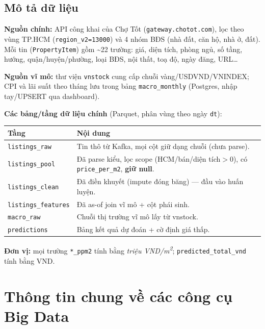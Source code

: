 \documentclass[12pt,a4paper]{article}
\begin{document}
\subsection{Mô tả dữ liệu}
\textbf{Nguồn chính:} API công khai của Chợ Tốt (\texttt{gateway.chotot.com}), lọc theo vùng TP.HCM (\texttt{region\_v2=13000}) và 4 nhóm BĐS (nhà đất, căn hộ, nhà ở, đất). Mỗi tin (\texttt{PropertyItem}) gồm \textasciitilde22 trường: giá, diện tích, phòng ngủ, số tầng, hướng, quận/huyện/phường, loại BĐS, nội thất, toạ độ, ngày đăng, URL\ldots

\textbf{Nguồn vĩ mô:} thư viện \texttt{vnstock} cung cấp chuỗi vàng/USDVND/VNINDEX; CPI và lãi suất theo tháng lưu trong bảng \texttt{macro\_monthly} (Postgres, nhập tay/UPSERT qua dashboard).

\textbf{Các bảng/tầng dữ liệu chính} (Parquet, phân vùng theo ngày \texttt{dt}):

\begin{center}
\begin{tabularx}{\textwidth}{@{}l X@{}}
\toprule
\textbf{Tầng} & \textbf{Nội dung} \\
\midrule
\texttt{listings\_raw}      & Tin thô từ Kafka, mọi cột giữ dạng chuỗi (chưa parse). \\
\texttt{listings\_pool}     & Đã parse kiểu, lọc scope (HCM/bán/diện tích$>$0), có \texttt{price\_per\_m2}, \textbf{giữ null}. \\
\texttt{listings\_clean}    & Đã điền khuyết (impute đóng băng) — đầu vào huấn luyện. \\
\texttt{listings\_features} & Đã as-of join vĩ mô + cột phái sinh. \\
\texttt{macro\_raw}         & Chuỗi thị trường vĩ mô lấy từ vnstock. \\
\texttt{predictions}        & Bảng kết quả dự đoán + cờ định giá thấp. \\
\bottomrule
\end{tabularx}
\end{center}

\noindent\textbf{Đơn vị:} mọi trường \texttt{*\_ppm2} tính bằng \textit{triệu VND/m\textsuperscript{2}}; \texttt{predicted\_total\_vnd} tính bằng VND.

\section{Thông tin chung về các công cụ Big Data}
\end{document}
